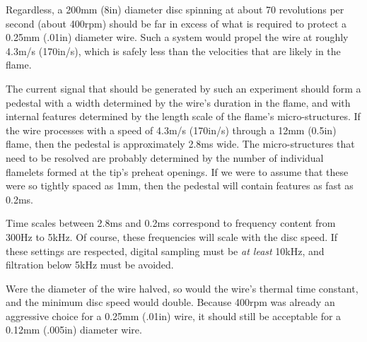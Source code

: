 Regardless, a 200mm (8in) diameter disc spinning at about 70 revolutions per second (about 400rpm) should be far in excess of what is required to protect a 0.25mm (.01in) diameter wire.  Such a system would propel the wire at roughly 4.3m/s (170in/s), which is safely less than the velocities that are likely in the flame.  

The current signal that should be generated by such an experiment should form a pedestal with a width determined by the wire's duration in the flame, and with internal features determined by the length scale of the flame's micro-structures.  If the wire processes with a speed of 4.3m/s (170in/s) through a 12mm (0.5in) flame, then the pedestal is approximately 2.8ms wide.  The micro-structures that need to be resolved are probably determined by the number of individual flamelets formed at the tip's preheat openings.  If we were to assume that these were so tightly spaced as 1mm, then the pedestal will contain features as fast as 0.2ms.

Time scales between 2.8ms and 0.2ms correspond to frequency content from 300Hz to 5kHz.  Of course, these frequencies will scale with the disc speed.  If these settings are respected, digital sampling must be \emph{at least} 10kHz, and filtration below 5kHz must be avoided.

Were the diameter of the wire halved, so would the wire's thermal time constant, and the minimum disc speed would double.  Because 400rpm was already an aggressive choice for a 0.25mm (.01in) wire, it should still be acceptable for a 0.12mm (.005in) diameter wire.

